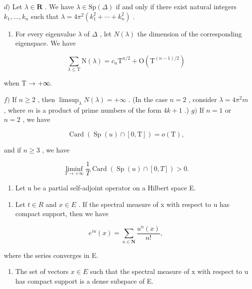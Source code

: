 \(d)\) Let \(\lambda\in\mathbf{R}\) . We have \(\lambda\in\mathrm{Sp}(\Delta)\) if and only if there exist natural integers \(k_{1},\ldots,k_{n}\) such that \(\lambda=4\pi^{2}(k_{1}^{2}+\cdots+k_{n}^{2})\) .

\begin{enumerate}
\def\labelenumi{\alph{enumi})}
\setcounter{enumi}{4}
\tightlist
\item
  For every eigenvalue \(\lambda\) of \(\Delta\) , let \(N(\lambda)\) the dimension of the corresponding eigenspace. We have
\end{enumerate}

\[
\sum_ {\lambda \leqslant \mathrm{T}} \mathrm{N} (\lambda) = c _ {n} \mathrm{T} ^ {n / 2} + \mathrm{O} (\mathrm{T} ^ {(n - 1) / 2})
\]

when T → +∞.

\(f)\) If \(n \geqslant 2\) , then \(\limsup_{\lambda} N(\lambda) = +\infty\) . (In the case \(n = 2\) , consider \(\lambda = 4\pi^2 m\) , where \(m\) is a product of prime numbers of the form \(4k + 1\) .) \(g)\) If \(n = 1\) or \(n = 2\) , we have

\[
\operatorname{Card} (\operatorname{Sp} (u) \cap [ 0, \mathrm{T} ]) = o (\mathrm{T}),
\]

and if \(n\geqslant 3\) , we have

\[
\liminf _ {T \to + \infty} \frac {1}{T} \operatorname{Card} (\operatorname{Sp} (u) \cap [ 0, T ]) > 0.
\]

\begin{enumerate}
\def\labelenumi{\arabic{enumi})}
\setcounter{enumi}{18}
\tightlist
\item
  Let u be a partial self-adjoint operator on a Hilbert space E.
\end{enumerate}

\begin{enumerate}
\def\labelenumi{\alph{enumi})}
\tightlist
\item
  Let \(t \in R\) and \(x \in E\) . If the spectral measure of x with respect to u has compact support, then we have
\end{enumerate}

\[
e ^ {i u} (x) = \sum_ {n \in \mathbf {N}} \frac {u ^ {n} (x)}{n !},
\]

where the series converges in E.

\begin{enumerate}
\def\labelenumi{\alph{enumi})}
\setcounter{enumi}{1}
\tightlist
\item
  The set of vectors \(x \in E\) such that the spectral measure of x with respect to u has compact support is a dense subspace of E.
\end{enumerate}

